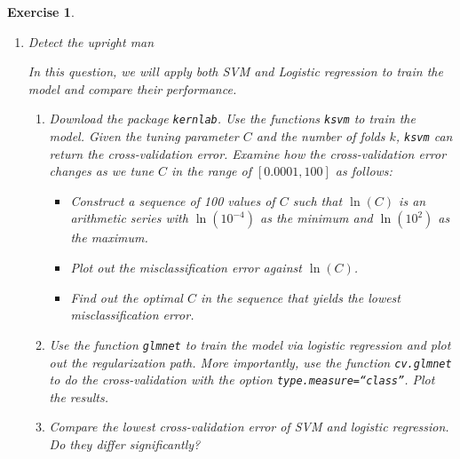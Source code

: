 \documentclass[12pt]{article}
\theoremstyle{colon}
\newtheorem{exercise}{Exercise}
\begin{document}
\begin{exercise}
\begin{enumerate}[label=\arabic*)]
\begin{enumerate}[label=\alph*)]
        \item Now, apply the above procedure to obtain feature vectors for each image in the dataset. Concatenate the feature vectors together into rows of a dataframe. Add an additional column indicatin whether each row is in \texttt{POS} or \texttt{NEG}. This will be the dataset you will use in Question 1.2.
      \end{enumerate}

    \item Detect the upright man

      In this question, we will apply both SVM and Logistic regression to train the model and compare their performance.
      \begin{enumerate}[label=\arabic*)]
        \item Download the package \texttt{kernlab}. Use the functions \texttt{ksvm} to train the model. Given the tuning parameter $C$ and the number of folds $k$, \texttt{ksvm} can return the cross-validation error. Examine how the cross-validation error changes as we tune $C$ in the range of $[0.0001, 100]$ as follows:

          \begin{itemize}
            \item Construct a sequence of 100 values of $C$ such that $\ln (C)$ is an arithmetic series with $\ln (10^{-4})$ as the minimum and $\ln (10^2)$ as the maximum.
            \item Plot out the misclassification error against $\ln(C)$.
            \item Find out the optimal $C$ in the sequence that yields the lowest misclassification error.
          \end{itemize}
        \item Use the function \texttt{glmnet} to train the model via logistic regression and plot out the regularization path. More importantly, use the function \texttt{cv.glmnet} to do the cross-validation with the option \texttt{type.measure=``class''}. Plot the results.
        \item Compare the lowest cross-validation error of SVM and logistic regression. Do they differ significantly?
      \end{enumerate}
  \end{enumerate}
\end{exercise}
\end{document}
